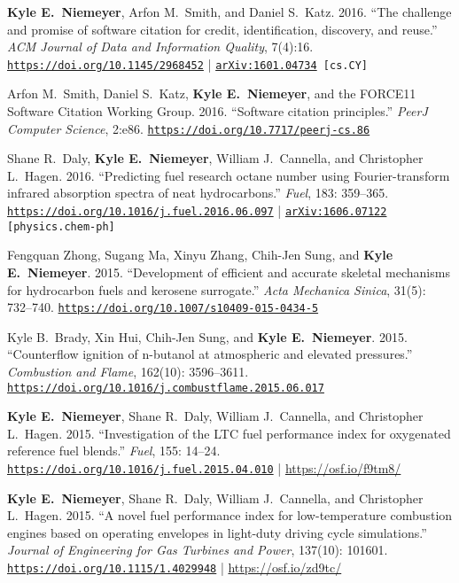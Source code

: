 \documentclass[margin,line,11pt]{res}
\makeatletter
\newlength{\bibhang}
\newlength{\bibsep}
 {\@listi \global\bibsep\itemsep \global\advance\bibsep by\parsep}
\newenvironment{bibenum*}
  {\renewcommand\labelenumi{\theenumi.}%
   \etaremune[
     topsep=0pt,
     itemsep=\bibsep,
     parsep=0pt,partopsep=0pt,
     itemindent=-\bibhang,
     leftmargin={\bibhang+\widthof{[999]}}]}
  {\endetaremune}
\newcommand*{\doi}[1]{\href{https://doi.org/#1}{\nolinkurl{https://doi.org/#1}}}
\makeatother
\begin{document}
\begin{resume}
\begin{bibenum*}
\item \textbf{Kyle E.\ Niemeyer}, Arfon M.\ Smith, and Daniel S.\ Katz.
2016.
``The challenge and promise of software citation for credit, identification, discovery, and reuse.''
\emph{ACM Journal of Data and Information Quality}, 7(4):16.
\doi{10.1145/2968452} |
{\tt \href{http://arxiv.org/abs/1601.04734}{arXiv:1601.04734} [cs.CY]}

\item Arfon M.~Smith, Daniel S.~Katz, \textbf{Kyle E.~Niemeyer}, and the FORCE11 Software Citation Working Group.
2016.
``Software citation principles.''
\emph{PeerJ Computer Science}, 2:e86.
\doi{10.7717/peerj-cs.86}

\item Shane R.~Daly, \textbf{Kyle E.~Niemeyer}, William J.~Cannella, and Christopher L.~Hagen.
2016.
``Predicting fuel research octane number using Fourier-transform infrared absorption spectra of neat hydrocarbons.''
\emph{Fuel}, 183: 359--365.
\doi{10.1016/j.fuel.2016.06.097} |
{\tt \href{http://arxiv.org/abs/1606.07122}{arXiv:1606.07122} [physics.chem-ph]}

\item Fengquan Zhong, Sugang Ma, Xinyu Zhang, Chih-Jen Sung, and \textbf{Kyle E.\ Niemeyer}.
2015.
``Development of efficient and accurate skeletal mechanisms for hydrocarbon fuels and kerosene surrogate.''
\emph{Acta Mechanica Sinica}, 31(5): 732--740.
\doi{10.1007/s10409-015-0434-5}

\item Kyle B.~Brady, Xin Hui, Chih-Jen Sung, and \textbf{Kyle E.~Niemeyer}.
2015.
``Counterflow ignition of n-butanol at atmospheric and elevated pressures.''
\emph{Combustion and Flame}, 162(10): 3596--3611.
\doi{10.1016/j.combustflame.2015.06.017}

\item \textbf{Kyle E.~Niemeyer}, Shane R.~Daly, William J.~Cannella, and Christopher L.~Hagen.
2015.
``Investigation of the LTC fuel performance index for oxygenated reference fuel blends.''
\emph{Fuel}, 155: 14--24.
\doi{10.1016/j.fuel.2015.04.010} | \url{https://osf.io/f9tm8/}

\item \textbf{Kyle E.\ Niemeyer}, Shane R.\ Daly, William J.\ Cannella, and Christopher L.\ Hagen.
2015.
``A novel fuel performance index for low-temperature combustion engines based on operating envelopes in light-duty driving cycle simulations.''
\emph{Journal of Engineering for Gas Turbines and Power}, 137(10): 101601.
\doi{10.1115/1.4029948} | \url{https://osf.io/zd9tc/}


\end{bibenum*}
\end{resume}
\end{document}

